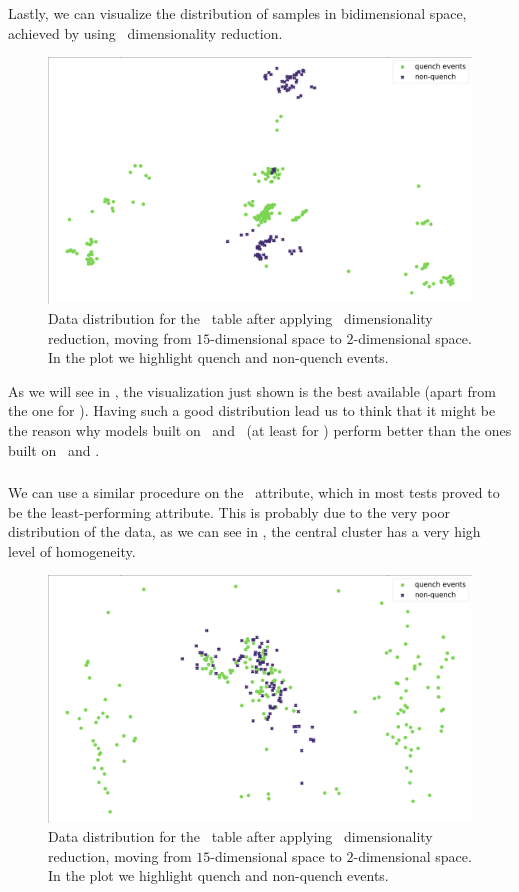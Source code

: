 Lastly, we can visualize the distribution of samples in bidimensional space, achieved by using \pca\
dimensionality reduction.
\begin{figure}[!ht]
	\centering
	\includegraphics[width=0.7\linewidth]{img/An_distribution.png}
	\caption{Data distribution for the \an\ table after applying \pca\ dimensionality reduction,
		moving from $15$-dimensional space to $2$-dimensional space. In the plot we highlight quench
		and non-quench events.} \label{fig:an-dist}
\end{figure}

As we will see in , the visualization just shown is the best available (apart
from the one for \cnmod). Having such a good distribution lead us to think that it might be the reason why
models built on \an\ and \cnmod\ (at least for \qrp) perform better than the ones built on \bn\ and
\phin.

\subsubsection{\bn}
We can use a similar procedure on the \bn\ attribute, which in most tests proved to be the
least-performing attribute. This is probably due to the very poor distribution of the data, as we can see in
\Cref{fig:bn-dist}, the central cluster has a very high level of homogeneity.
\begin{figure}[!ht]
	\centering
	\includegraphics[width=0.7\linewidth]{img/Bn_distribution.png}
	\caption{Data distribution for the \bn\ table after applying \pca\ dimensionality
		reduction, moving from $15$-dimensional space to $2$-dimensional space. In the plot
		we highlight quench and non-quench events.} \label{fig:bn-dist}
\end{figure}

